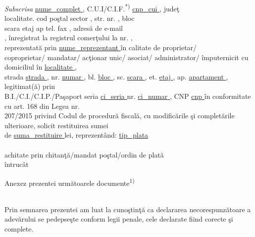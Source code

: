 \documentclass[11pt,a4paper]{article}
\newcommand{\fillline}[1][6cm]{\underline{\hspace{#1}}}
\begin{document}
\hspace{0.5cm}\textit{Subscrisa} \underline{ {{nume_complet}} }, C.U.I/C.I.F.\textsuperscript{*)} \underline{ {{cnp_cui}} }, judeţ \fillline[3cm]\\
localitate. \fillline[4cm] cod poştal \fillline[3cm] sector \fillline[1cm], str. \fillline[6cm] nr. \fillline[1.5cm], bloc \fillline[1.5cm]\\
scara \fillline[1.5cm] etaj \fillline[1.5cm] ap \fillline[2cm] tel. \fillline[3cm] fax \fillline[3cm], adresă de e-mail\\
\fillline[6cm], înregistrat la registrul comerţului \fillline[4cm] la nr. \fillline[3cm],\\
reprezentată prin \underline{ {{nume_reprezentant}} } în calitate de proprietar/\\
coproprietar/ mandatar/ acţionar unic/ asociat/ administrator/ împuternicit cu domiciliul în \underline{ {{localitate}} },\\
strada \underline{ {{strada}} }, nr. \underline{ {{numar}} }, bl. \underline{ {{bloc}} }, sc. \underline{ {{scara}} }, et. \underline{ {{etaj}} }, ap. \underline{ {{apartament}} }, legitimat(ă) prin\\
B.I./C.I./C.I.P./Paşaport seria \underline{ {{ci_seria}} } nr. \underline{ {{ci_numar}} }, CNP \underline{ {{cnp}} } în conformitate cu art. 168 din Legea nr.\\
207/2015 privind Codul de procedură fiscală, cu modificările şi completările ulterioare, solicit restituirea sumei\\
de \underline{ {{suma_restituire}} } lei, reprezentând: \underline{ {{tip_plata}} }\\
\hrulefill\\
achitate prin chitanţă/mandat poştal/ordin de plată \hrulefill\\
întrucât \hrulefill\\
\hrulefill

\vspace{0.3cm}

\hspace{0.5cm}Anexez prezentei următoarele documente\textsuperscript{1)} \hrulefill\\
\hrulefill\\
\hrulefill

\vspace{0.3cm}

Prin semnarea prezentei am luat la cunoştinţă ca declararea necorespunzătoare a adevărului se pedepseşte conform legii penale, cele declarate fiind corecte şi complete.
\end{document}
